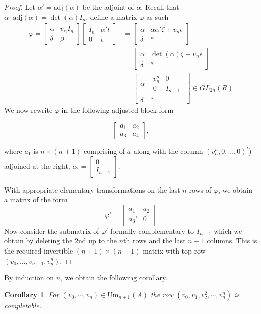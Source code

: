\documentclass[12pt]{report}
\numberwithin{equation}{section}
\newcounter{dummy} \numberwithin{dummy}{section}
\newtheorem{corollary}[dummy]{Corollary}
\begin{document}
\begin{proof}
	 Let $\alpha' = \text{adj}(\alpha)$ be the adjoint of $\alpha$. Recall that $\alpha \cdot \mathrm{adj}(\alpha )= \det (\alpha) I_n$, define a matrix $\varphi$ as such
		\begin{align*}
			\varphi = \begin{bmatrix} \alpha & v_nI_n \\ \delta & \beta \end{bmatrix} \begin{bmatrix} I_n & \alpha't \\ 0 & \epsilon \end{bmatrix} &= \begin{bmatrix} \alpha & \alpha \alpha' \zeta + v_n \epsilon  \\ \delta & * \end{bmatrix}\\
			&= \begin{bmatrix} \alpha & \det(\alpha) \zeta + v_n \epsilon \\ \delta & * \end{bmatrix} \\
			&= \left[ \begin{array}{c|c}
				\alpha & \begin{matrix}
					v_n^n & 0\\
					0 & I_{n-1}
				\end{matrix}\\ \hline
				\delta & *
			\end{array} \right ]\in GL_{2n}(R) 
		\end{align*}
		We now rewrite $\varphi$ in the following adjusted block form
		
		\[\begin{bmatrix} a_1 & a_2 \\ a_3 & a_4 \end{bmatrix},\] 
		
		where $a_1$ is $n \times (n+1)$ comprising of $a$ along with the column $(v_n^n, 0, \ldots, 0)^t$) adjoined at the right, $a_2 = \begin{bmatrix} 0 \\ I_{n-1} \end{bmatrix}$. 
		
		With appropriate elementary transformations on the last $n$ rows of $\varphi$, we obtain a matrix of the form
		\[\varphi' = \begin{bmatrix} a_1 & a_2 \\ a_3' & 0 \end{bmatrix}\]
		Now consider the submatrix of $\varphi'$ formally complementary to $I_{n-1}$ which we obtain by deleting the $2$nd up to the $n$th rows and the last $n-1$ columns. This is the required invertible $(n+1) \times (n+1)$ matrix with top row $(v_0,\ldots,v_{n-1},v_n^n)$.

		
	\end{proof}
	By induction on $n$, we obtain the following corollary.
	\begin{corollary}\label{corprefactorial}
		For $(v_0, \cdots, v_n) \in \mathrm{Um}_{n+1}(A)$ the row $(v_0, v_1, v_2^2, \cdots, v_n^n)$ is completable.
	\end{corollary}
	
\end{document}
